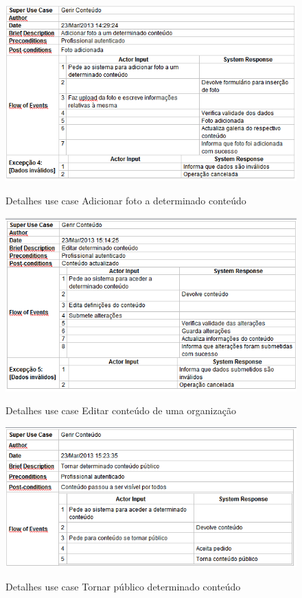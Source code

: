 ﻿\documentclass[12pt,a4paper]{article}
\begin{document}
\begin{figure}[h!]
\centering
\includegraphics[scale=0.7]{d_usecase/P_adicionarfoto}
\label{usecase}
\caption{Detalhes use case Adicionar foto a determinado conteúdo}
\end{figure}

\begin{figure}[h!]
\centering
\includegraphics[scale=0.7]{d_usecase/editarconteudo}
\label{usecase}
\caption{Detalhes use case Editar conteúdo de uma organização}
\end{figure}

\begin{figure}[h!]
\centering
\includegraphics[scale=0.7]{d_usecase/tornarpublico}
\label{usecase}
\caption{Detalhes use case Tornar público determinado conteúdo}
\end{figure}
\end{document}
